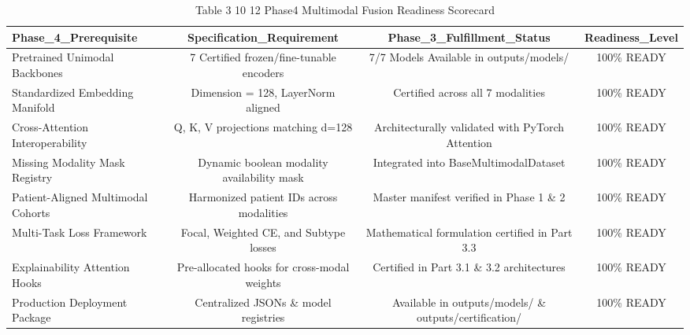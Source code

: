 \begin{table}[htbp]
\centering
\small
\begin{tabular}{lccc}
\hline
Phase\_4\_Prerequisite & Specification\_Requirement & Phase\_3\_Fulfillment\_Status & Readiness\_Level \\
\hline
Pretrained Unimodal Backbones & 7 Certified frozen/fine-tunable encoders & 7/7 Models Available in outputs/models/ & 100\% READY \\
Standardized Embedding Manifold & Dimension = 128, LayerNorm aligned & Certified across all 7 modalities & 100\% READY \\
Cross-Attention Interoperability & Q, K, V projections matching d=128 & Architecturally validated with PyTorch Attention & 100\% READY \\
Missing Modality Mask Registry & Dynamic boolean modality availability mask & Integrated into BaseMultimodalDataset & 100\% READY \\
Patient-Aligned Multimodal Cohorts & Harmonized patient IDs across modalities & Master manifest verified in Phase 1 \& 2 & 100\% READY \\
Multi-Task Loss Framework & Focal, Weighted CE, and Subtype losses & Mathematical formulation certified in Part 3.3 & 100\% READY \\
Explainability Attention Hooks & Pre-allocated hooks for cross-modal weights & Certified in Part 3.1 \& 3.2 architectures & 100\% READY \\
Production Deployment Package & Centralized JSONs \& model registries & Available in outputs/models/ \& outputs/certification/ & 100\% READY \\
\hline
\end{tabular}
\caption{Table 3 10 12 Phase4 Multimodal Fusion Readiness Scorecard}
\label{tab:table_3_10_12_phase4_multimodal_fusion_readiness_scorecard}
\end{table}
